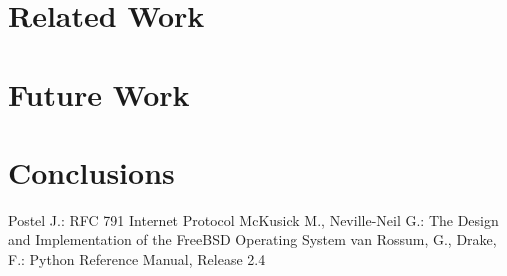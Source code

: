 \documentclass{sig-alternate-10pt}
\begin{document}
\section{Related Work}
\label{sec:related-work}

\section{Future Work}
\label{sec:future-work}

\section{Conclusions}
\label{sec:conclusions}

\label{sec:bibliography}
\begin{thebibliography}{99} 
 Postel J.: 
RFC 791 Internet Protocol
 McKusick M., Neville-Neil G.:
The Design and Implementation of the FreeBSD Operating System
 van Rossum, G., Drake, F.:
Python Reference Manual, Release 2.4
\end{thebibliography}
\end{document}
